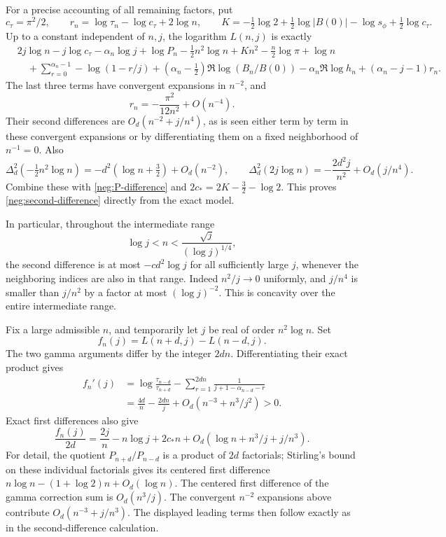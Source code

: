 \documentclass[11pt]{article}
\numberwithin{equation}{section}
\theoremstyle{definition}
\begin{document}
For a precise accounting of all remaining factors, put
\[
 c_\tau=\pi^2/2,\qquad
 r_n=\log\tau_n-\log c_\tau+2\log n,\qquad
 K=-\tfrac12\log2+\tfrac12\log|B(0)|
                      -\log s_\phi+\tfrac12\log c_\tau .
 \]
Up to a constant independent of \(n,j\), the logarithm
\(L(n,j)\) is exactly
\begin{align*}
 &2j\log n-j\log c_\tau-\alpha_n\log j
   +\log P_n-\tfrac12n^2\log n+Kn^2
                 -\tfrac n2\log\pi+\log n\\
 &\quad+
 \sum_{r=0}^{\alpha_n-1}-\log(1-r/j)
 +(\alpha_n-\tfrac12)\Re\log(B_n/B(0))
 -\alpha_n\Re\log h_n+(\alpha_n-j-1)r_n .
\end{align*}
The last three terms have convergent expansions in \(n^{-2}\),
and
\[
 r_n=-\frac{\pi^2}{12n^2}+O(n^{-4}).
 \]
Their second differences are
\(O_d(n^{-2}+j/n^4)\), as is seen either term by term in
these convergent expansions or by differentiating them on
a fixed neighborhood of \(n^{-1}=0\).
Also
\[
 \Delta_d^2(-\tfrac12n^2\log n)
     =-d^2(\log n+\tfrac32)+O_d(n^{-2}),\qquad
 \Delta_d^2(2j\log n)
     =-\frac{2d^2j}{n^2}+O_d(j/n^4).
 \]
Combine these with \eqref{neg:P-difference} and
\(2c_*=2K-\tfrac32-\log2\).  This proves
\eqref{neg:second-difference} directly from the exact
model.

In particular, throughout the intermediate range
\begin{equation}
 \log j<n<\frac{\sqrt j}{(\log j)^{1/4}},
 \label{neg:middle-range}
\end{equation}
the second difference is at most \(-c d^2\log j\) for all
sufficiently large \(j\), whenever the neighboring indices
are also in that range.  Indeed \(n^2/j\to0\) uniformly,
and \(j/n^4\) is smaller than \(j/n^2\) by a factor at most
\((\log j)^{-2}\).  This is concavity over the entire
intermediate range.

Fix a large admissible \(n\), and temporarily let \(j\) be
real of order \(n^2\log n\).  Set
\[
 f_n(j)=L(n+d,j)-L(n-d,j).
 \]
The two gamma arguments differ by the integer \(2dn\).
Differentiating their exact product gives
\begin{align}
 f_n'(j)
 &=\log\frac{\tau_{n-d}}{\tau_{n+d}}
   -\sum_{r=1}^{2dn}
       \frac1{j+1-\alpha_{n-d}-r}\\
 &=\frac{4d}{n}-\frac{2dn}{j}
       +O_d(n^{-3}+n^3/j^2)>0 .
 \label{neg:crossing-derivative}
\end{align}
Exact first differences also give
\begin{equation}
 \frac{f_n(j)}{2d}
 =\frac{2j}{n}-n\log j+2c_*n
       +O_d(\log n+n^3/j+j/n^3).
 \label{neg:first-difference}
\end{equation}
For detail, the quotient \(P_{n+d}/P_{n-d}\) is a
product of \(2d\) factorials; Stirling's bound on these
individual factorials gives its centered first difference
\(n\log n-(1+\log2)n+O_d(\log n)\).
The centered first difference of the gamma correction sum
is \(O_d(n^3/j)\).  The convergent \(n^{-2}\) expansions
above contribute \(O_d(n^{-3}+j/n^3)\).
The displayed leading terms then follow exactly as in the
second-difference calculation.
\end{document}
